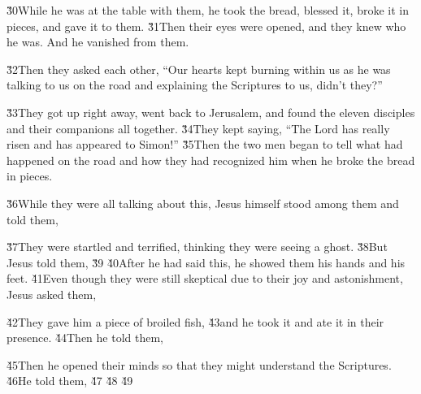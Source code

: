 \v{30}While he was at the table with them, he took the bread, blessed it, broke it in pieces, and gave it to them. \v{31}Then their eyes were opened, and they knew who he was. And he vanished from them.

\v{32}Then they asked each other, ``Our hearts kept burning within us as he was talking to us on the road and explaining the Scriptures to us, didn't they?''

\v{33}They got up right away, went back to Jerusalem, and found the eleven disciples and their companions all together. \v{34}They kept saying, ``The Lord has really risen and has appeared to Simon!'' \v{35}Then the two men began to tell what had happened on the road and how they had recognized him when he broke the bread in pieces.

\v{36}While they were all talking about this, Jesus himself stood among them and told them, 

\v{37}They were startled and terrified, thinking they were seeing a ghost. \v{38}But Jesus told them,  \v{39} \v{40}After he had said this, he showed them his hands and his feet. \v{41}Even though they were still skeptical due to their joy and astonishment, Jesus asked them, 

\v{42}They gave him a piece of broiled fish, \v{43}and he took it and ate it in their presence. \v{44}Then he told them, 

\v{45}Then he opened their minds so that they might understand the Scriptures. \v{46}He told them,  \v{47} \v{48} \v{49}

